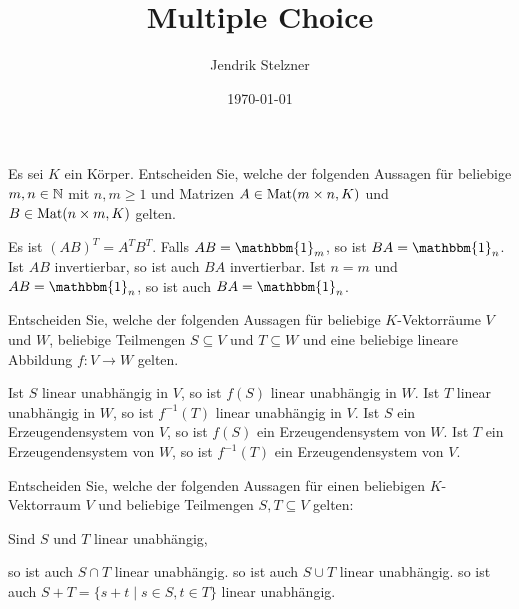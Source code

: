 \documentclass[a4paper,10pt]{exam}
\title{Multiple Choice}
\author{Jendrik Stelzner}
\date{\today}
\begin{document}
\maketitle
\begin{questions}






\question Es sei $K$ ein Körper. Entscheiden Sie, welche der folgenden Aussagen für beliebige $m,n \in \mathbb{N}$ mit $n,m \geq 1$ und Matrizen $A \in \mathrm{Mat}(m \times n, K)$ und $B \in \mathrm{Mat}(n \times m, K)$ gelten.
\begin{checkboxes}
 \choice
  Es ist $(AB)^T = A^T B^T$.
 \choice
  Falls $AB = \mathbbm{1}_m$, so ist $BA = \mathbbm{1}_n$.
 \choice
  Ist $AB$ invertierbar, so ist auch $BA$ invertierbar.
 \choice
  Ist $n = m$ und $AB = \mathbbm{1}_n$, so ist auch $BA = \mathbbm{1}_n$.
\end{checkboxes}











\question Entscheiden Sie, welche der folgenden Aussagen für beliebige $K$-Vektorräume $V$ und $W$, beliebige Teilmengen $S \subseteq V$ und $T \subseteq W$ und eine beliebige lineare Abbildung $f \colon V \to W$ gelten.
\begin{checkboxes}
 \choice
  Ist $S$ linear unabhängig in $V$, so ist $f(S)$ linear unabhängig in $W$.
 \choice
  Ist $T$ linear unabhängig in $W$, so ist $f^{-1}(T)$ linear unabhängig in $V$.
 \choice
  Ist $S$ ein Erzeugendensystem von $V$, so ist $f(S)$ ein Erzeugendensystem von $W$.
 \choice
  Ist $T$ ein Erzeugendensystem von $W$, so ist $f^{-1}(T)$ ein Erzeugendensystem von $V$.
\end{checkboxes}

\question Entscheiden Sie, welche der folgenden Aussagen für einen beliebigen $K$-Vektorraum $V$ und beliebige Teilmengen $S, T \subseteq V$ gelten:

Sind $S$ und $T$ linear unabhängig,
\begin{checkboxes}
 \choice
  so ist auch $S \cap T$ linear unabhängig.
 \choice
  so ist auch $S \cup T$ linear unabhängig.
 \choice
  so ist auch $S + T = \{s + t \mid s \in S, t \in T\}$ linear unabhängig.
\end{checkboxes}


\end{questions}
\end{document}
